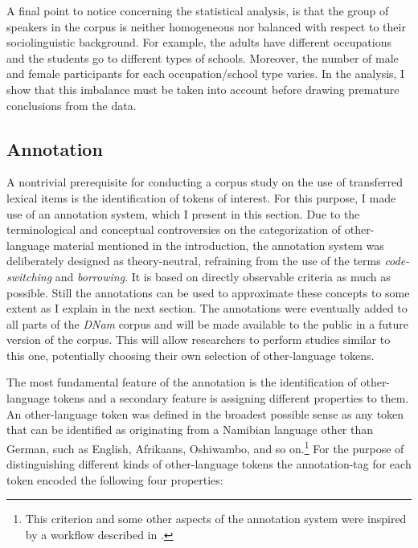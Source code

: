 \documentclass[output=paper]{langsci/langscibook}
\begin{document}
A final point to notice concerning the statistical analysis, is that the group of speakers in the corpus is neither homogeneous nor balanced with respect to their sociolinguistic background. For example, the adults have different occupations and the students go to different types of schools. Moreover, the number of male and female participants for each occupation/school type varies. In the analysis, I show that this imbalance must be taken into account before drawing premature conclusions from the data.

 
   
\subsection{Annotation}
  \label{sec:bracke:4.2}
 

A nontrivial prerequisite for conducting a corpus study on the use of transferred lexical items is the identification of tokens of interest. For this purpose, I made use of an annotation system, which I present in this section. Due to the terminological and conceptual controversies on the categorization of other-language material mentioned in the introduction, the annotation system was deliberately designed as theory-neutral, refraining from the use of the terms \textit{code-switching} and \textit{borrowing}. It is based on directly observable criteria as much as possible. Still the annotations can be used to approximate these concepts to some extent as I explain in the next section. The annotations were eventually added to all parts of the \textit{DNam} corpus and will be made available to the public in a future version of the corpus. This will allow researchers to perform studies similar to this one, potentially choosing their own selection of other-language tokens.

The most fundamental feature of the annotation is the identification of other-language tokens and a secondary feature is assigning different properties to them. An other-language token was defined in the broadest possible sense as any token that can be identified as originating from a Namibian language other than German, such as English, Afrikaans, Oshiwambo, and so on.\footnote{This criterion and some other aspects of the annotation system were inspired by a workflow described in \citet[42]{poplack_borrowing_2018}.} For the purpose of distinguishing different kinds of other-language tokens the annotation-tag for each token encoded the following four properties:
\end{document}

